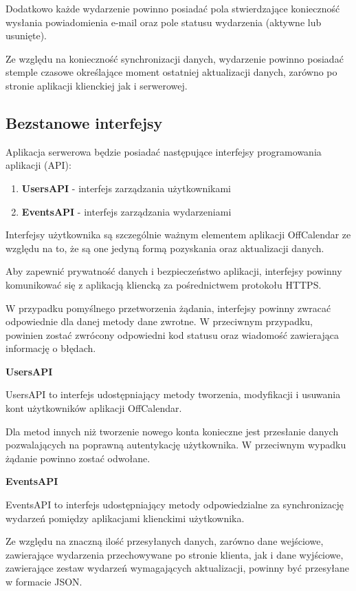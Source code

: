 Dodatkowo każde wydarzenie powinno posiadać pola stwierdzające konieczność wysłania powiadomienia e-mail oraz pole statusu wydarzenia (aktywne lub usunięte). 

Ze względu na konieczność synchronizacji danych, wydarzenie powinno posiadać stemple czasowe określające moment ostatniej aktualizacji danych, zarówno po stronie aplikacji klienckiej jak i serwerowej.

\subsection{Bezstanowe interfejsy}
\label{bezstanoweInter}

Aplikacja serwerowa będzie posiadać następujące interfejsy programowania aplikacji (API):

\begin{enumerate}
\item \textbf{UsersAPI} - interfejs zarządzania użytkownikami
\item \textbf{EventsAPI} - interfejs zarządzania wydarzeniami
\end{enumerate}

Interfejsy użytkownika są szczególnie ważnym elementem aplikacji OffCalendar ze względu na to, że są one jedyną formą pozyskania oraz aktualizacji danych. 

Aby zapewnić prywatność danych i bezpieczeństwo aplikacji, interfejsy powinny komunikować się z aplikacją kliencką za pośrednictwem protokołu HTTPS.

W przypadku pomyślnego przetworzenia żądania, interfejsy powinny zwracać odpowiednie dla danej metody dane zwrotne. W przeciwnym przypadku, powinien zostać zwrócony odpowiedni kod statusu oraz wiadomość zawierająca informację o błędach.

\textbf{UsersAPI}

UsersAPI to interfejs udostępniający metody tworzenia, modyfikacji i usuwania kont użytkowników aplikacji OffCalendar.

Dla metod innych niż tworzenie nowego konta konieczne jest przesłanie danych pozwalających na poprawną autentykację użytkownika. W przeciwnym wypadku żądanie powinno zostać odwołane.

\textbf{EventsAPI}

EventsAPI to interfejs udostępniający metody odpowiedzialne za synchronizację wydarzeń pomiędzy aplikacjami klienckimi użytkownika.

Ze względu na znaczną ilość przesyłanych danych, zarówno dane wejściowe, zawierające wydarzenia przechowywane po stronie klienta, jak i dane wyjściowe, zawierające zestaw wydarzeń wymagających aktualizacji, powinny być przesyłane w formacie JSON.

